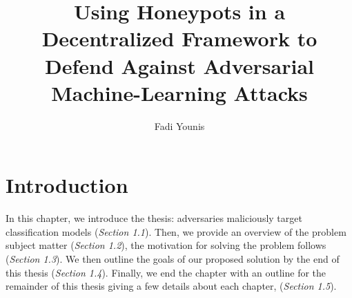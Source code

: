 \documentclass[grad,lot,lof,11pt,oneside,onehalfspace]{RUthesis}
\title{Using  Honeypots in a Decentralized  Framework  to Defend Against Adversarial Machine-Learning Attacks }
\author{Fadi Younis}
\begin{document}
\maketitle
 
\chapter{Introduction}
 In this chapter, we introduce the thesis: adversaries maliciously target classification models (\textit{Section 1.1}). Then, we provide an overview of the problem subject matter (\textit{Section 1.2}), the motivation for solving the problem follows (\textit{Section 1.3}). We then outline the goals of our proposed solution by the end of this thesis (\textit{Section 1.4}). Finally, we end the chapter with an outline for the remainder of this thesis giving a few details about each chapter, (\textit{Section 1.5}).
\end{document}
